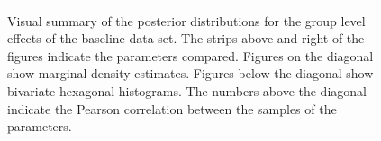 \documentclass[a4paper]{article}
\begin{document}
\begin{figure}[!ht]
	\includegraphics[width=\textwidth]{baselinePosteriorDescriptivesPlot.pdf}
	\caption{Visual summary of the posterior distributions for the group level effects of the baseline data set. The strips above and right of the figures indicate the parameters compared. Figures on the diagonal show marginal density estimates. Figures below the diagonal show bivariate hexagonal histograms. The numbers above the diagonal indicate the Pearson correlation between the samples of the parameters.}
	\label{fig:baselinePosteriorDescriptives}
\end{figure}
\end{document}
